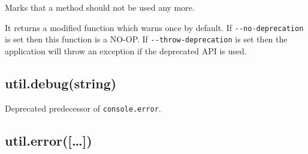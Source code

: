 Marks that a method should not be used any more.

\begin{Shaded}
\begin{Highlighting}[]
 \NormalTok{= }\NormalTok{(}\NormalTok{() \{}
   \NormalTok{(} 
    \NormalTok{);}
  \NormalTok{\}}
\NormalTok{\}, }\NormalTok{)}
\end{Highlighting}
\end{Shaded}

It returns a modified function which warns once by default. If
\texttt{-{}-no-deprecation} is set then this function is a NO-OP. If
\texttt{-{}-throw-deprecation} is set then the application will throw an
exception if the deprecated API is used.

\subsection{util.debug(string)}\label{util.debugstring}

\begin{Shaded}
\begin{Highlighting}[]
 \NormalTok{() }
\end{Highlighting}
\end{Shaded}

Deprecated predecessor of \texttt{console.error}.

\subsection{util.error({[}\ldots{}{]})}\label{util.error}

\begin{Shaded}
\begin{Highlighting}[]
 \NormalTok{() }
\end{Highlighting}
\end{Shaded}

